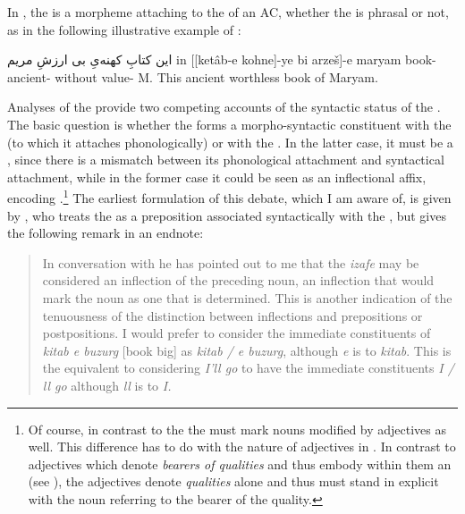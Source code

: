 In , the \ez* is a  morpheme attaching to the \prim of an AC, whether the \prim is phrasal or not, as in the following illustrative example of \citet{SamvelianEzafe}:

{این کتابِ کهنه‌یِ بی ارزشِ مریم}
{in [[ketâb-e kohne]-ye bi arzeš]-e maryam}
{\dem{} book-\ez{} ancient-\ez{} without value-\ez{} M.}
{This ancient worthless book of Maryam.}
{\citep[606]{SamvelianEzafe}}

Analyses of the \ez* provide two competing accounts of the syntactic status of the \ez*. The basic question is whether the \ez* forms a morpho-syntactic constituent with the \prim (to which it attaches phonologically) or with the \secn. In the latter case, it must be a , since there is a mismatch between its phonological attachment and syntactical attachment, while in the former case it could be seen as an inflectional affix, encoding \cst*.\footnote{Of course, in contrast to the  \cst* the \ez* must mark nouns modified by adjectives as well. This difference has to do with the nature of adjectives in . In contrast to  adjectives which denote \textit{bearers of qualities} and thus embody within them an  (see ), the  adjectives denote \textit{qualities} alone and thus must stand in explicit  with the noun referring to the bearer of the quality.} The earliest formulation of this debate, which I am aware of, is given by \citet[41]{Fairbanks}, who treats the \ez* as a preposition associated syntactically with the \secn, but gives the following remark in an endnote: 
\blockquote[{\cite[43, note 1]{Fairbanks}}]{In conversation with  he has pointed out to me that the \textit{izafe} may be considered an inflection of the preceding noun, an inflection that would mark the noun as one that is determined. This is another indication of the tenuousness of the distinction between inflections and prepositions or postpositions. I would prefer to consider the immediate constituents of \textit{kitab e buzurg} [book \ez{} big]  as \textit{kitab / e buzurg}, although \textit{e} is  to \textit{kitab}. This is the equivalent to considering \textit{I'll go} to have the immediate constituents \textit{I / ll go} although \textit{ll} is  to \textit{I.}}

